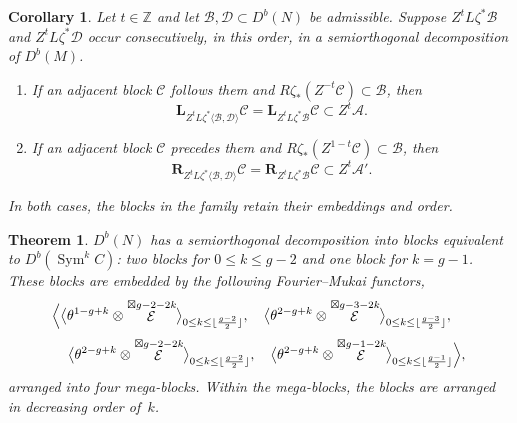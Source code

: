 \documentclass[10pt,a4paper]{amsart}
\newtheorem{theorem}{Theorem}
\newtheorem{corollary}{Corollary}
\DeclareMathOperator{\cE}{\mathcal{E}}
\begin{document}
\begin{corollary}\label{pw:available-prefix}
Let $t\in\mathbb Z$ and let $\mathcal B,\mathcal D\subset D^b(N)$ be
admissible. Suppose $Z^tL\zeta^*\mathcal B$ and
$Z^tL\zeta^*\mathcal D$ occur consecutively, in this order, in a
semiorthogonal decomposition of $D^b(M)$.
\begin{enumerate}
\item If an adjacent block $\mathcal C$ follows them and
$R\zeta_*(Z^{-t}\mathcal C)\subset\mathcal B$, then
\[
 \mathbf L_{Z^tL\zeta^*\langle\mathcal B,\mathcal D\rangle}\mathcal C
 =\mathbf L_{Z^tL\zeta^*\mathcal B}\mathcal C
 \subset Z^t\mathcal A.
\]
\item If an adjacent block $\mathcal C$ precedes them and
$R\zeta_*(Z^{1-t}\mathcal C)\subset\mathcal B$, then
\[
 \mathbf R_{Z^tL\zeta^*\langle\mathcal B,\mathcal D\rangle}\mathcal C
 =\mathbf R_{Z^tL\zeta^*\mathcal B}\mathcal C
 \subset Z^t\mathcal A'.
\]
\end{enumerate}
In both cases, the blocks in the family retain their embeddings and order.
\end{corollary}

\begin{theorem}\label{MainTheorem}
$D^b(N)$ has a semiorthogonal decomposition into blocks equivalent to
$D^b(\operatorname{Sym}^kC)$: two blocks for $0\le k\le g-2$ and one
block for $k=g-1$. These blocks are
embedded by the following Fourier--Mukai functors,
$$
\Bigl\langle
\bigl\langle 
{\theta}^{1-g+k}\otimes\cE^{\boxtimes g-2-2k}
\bigr\rangle_{0\le k\le \lfloor{g-2\over2}\rfloor},\quad
\bigl\langle 
{\theta}^{2-g+k}\otimes\cE^{\boxtimes g-3-2k}
\bigr\rangle_{0\le k\le  \lfloor{g-3\over2}\rfloor},\quad{}$$
$${}\quad\bigl\langle 
{\theta}^{2-g+k}\otimes\cE^{\boxtimes g-2-2k}
\bigr\rangle_{0\le k\le \lfloor{g-2\over2}\rfloor},
\quad \bigl\langle 
{\theta}^{2-g+k}\otimes\cE^{\boxtimes g-1-2k}
\bigr\rangle_{0\le k\le  \lfloor{g-1\over2}\rfloor}
\Bigr\rangle,
$$ 
arranged into four mega-blocks.
Within the mega-blocks, the 
blocks are arranged in decreasing order of~$k$.
\end{theorem}
\end{document}
